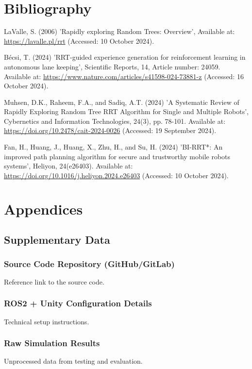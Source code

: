 \documentclass[a4paper,11pt]{report}
\begin{document}
\newpage

\chapter{Bibliography}

\begin{thebibliography}{4}

     LaValle, S. (2006) 'Rapidly exploring Random Trees: Overview', Available at: \url{https://lavalle.pl/rrt} (Accessed: 10 October 2024).
    
     Bécsi, T. (2024) 'RRT-guided experience generation for reinforcement learning in autonomous lane keeping', Scientific Reports, 14, Article number: 24059. Available at: \url{https://www.nature.com/articles/s41598-024-73881-z} (Accessed: 16 October 2024).
    
     Muhsen, D.K., Raheem, F.A., and Sadiq, A.T. (2024) 'A Systematic Review of Rapidly Exploring Random Tree RRT Algorithm for Single and Multiple Robots', Cybernetics and Information Technologies, 24(3), pp. 78-101. Available at: \url{https://doi.org/10.2478/cait-2024-0026} (Accessed: 19 September 2024).
    
     Fan, H., Huang, J., Huang, X., Zhu, H., and Su, H. (2024) 'BI-RRT*: An improved path planning algorithm for secure and trustworthy mobile robots systems', Heliyon, 24(e26403). Available at: \url{https://doi.org/10.1016/j.heliyon.2024.e26403} (Accessed: 10 October 2024).
    
\end{thebibliography}

\newpage
 
\chapter{Appendices}
\section{Supplementary Data}
\subsection{Source Code Repository (GitHub/GitLab)}
Reference link to the source code.

\subsection{ROS2 + Unity Configuration Details}
Technical setup instructions.

\subsection{Raw Simulation Results}
Unprocessed data from testing and evaluation.
\end{document}
